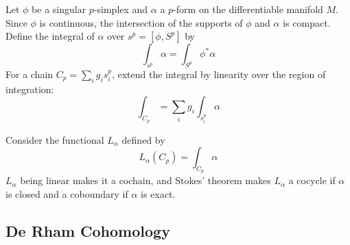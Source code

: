\begin{defn}

Let $ \phi$ be a singular $p$-simplex and $ \alpha$ a $p$-form on the differentiable manifold $M$. Since $ \phi$ is continuous, the intersection of the supports of $ \phi$ and $ \alpha$ is compact. Define the integral of $ \alpha$ over $s^p = \left[ \phi, S^p \right]$ by 
\[
	\int_{s^p} \alpha = \int_{ S^p } \phi^* \alpha
\]
For a chain $C_p = \sum_i g_i s^p_i$, extend the integral by linearity over the region of integration:
\[
\int_{ C_p } = \sum_i g_i \int_{ s^p_i } \alpha
\]
\end{defn}

\begin{prop}

Consider the functional $L_{ \alpha }$ defined by 
\[
	L_{ \alpha } \left( C_p \right) = \int_{ C_p } \alpha
\]
$L_{ \alpha }$ being linear makes it a cochain, and Stokes' theorem makes $L_{ \alpha }$ a cocycle if $ \alpha$ is closed and a coboundary if $ \alpha$ is exact.

\end{prop}

\subsection{De Rham Cohomology}






























